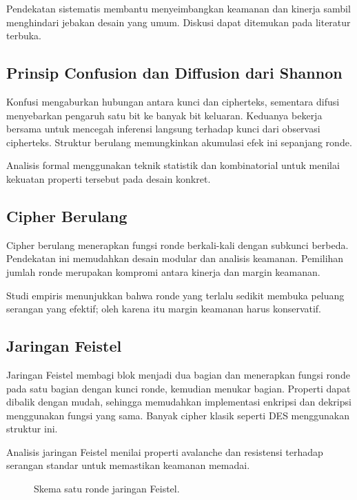 \documentclass[../main.tex]{subfiles}
\begin{document}
Pendekatan sistematis membantu menyeimbangkan keamanan dan kinerja sambil menghindari jebakan desain yang umum. Diskusi dapat ditemukan pada literatur terbuka.

\subsection{Prinsip Confusion dan Diffusion dari Shannon}
Konfusi mengaburkan hubungan antara kunci dan cipherteks, sementara difusi menyebarkan pengaruh satu bit ke banyak bit keluaran. Keduanya bekerja bersama untuk mencegah inferensi langsung terhadap kunci dari observasi cipherteks. Struktur berulang memungkinkan akumulasi efek ini sepanjang ronde.

Analisis formal menggunakan teknik statistik dan kombinatorial untuk menilai kekuatan properti tersebut pada desain konkret.

\subsection{Cipher Berulang}
Cipher berulang menerapkan fungsi ronde berkali-kali dengan subkunci berbeda. Pendekatan ini memudahkan desain modular dan analisis keamanan. Pemilihan jumlah ronde merupakan kompromi antara kinerja dan margin keamanan.

Studi empiris menunjukkan bahwa ronde yang terlalu sedikit membuka peluang serangan yang efektif; oleh karena itu margin keamanan harus konservatif.

\subsection{Jaringan Feistel}
Jaringan Feistel membagi blok menjadi dua bagian dan menerapkan fungsi ronde pada satu bagian dengan kunci ronde, kemudian menukar bagian. Properti dapat dibalik dengan mudah, sehingga memudahkan implementasi enkripsi dan dekripsi menggunakan fungsi yang sama. Banyak cipher klasik seperti DES menggunakan struktur ini.

Analisis jaringan Feistel menilai properti avalanche dan resistensi terhadap serangan standar untuk memastikan keamanan memadai.

\begin{figure}[h]
\centering
{}
\caption{Skema satu ronde jaringan Feistel.}
\label{fig:feistel}
\end{figure}
\end{document}
